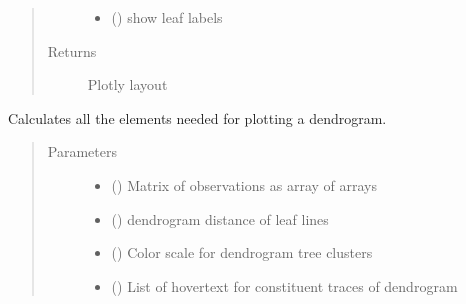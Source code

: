 \documentclass[letterpaper,10pt,english]{sphinxmanual}
\begin{document}
\begin{fulllineitems}
\begin{fulllineitems}
\begin{quote}
\begin{description}
\begin{itemize}
\item {} 
 () \textendash{} show leaf labels

\end{itemize}

\item[{Returns}] \leavevmode
Plotly layout

\end{description}\end{quote}

\end{fulllineitems}


\begin{fulllineitems}
\label{\detokenize{_autosummary/analytics_core.viz:analytics_core.viz.Dendrogram.Dendrogram.get_dendrogram_traces}}
Calculates all the elements needed for plotting a dendrogram.
\begin{quote}\begin{description}
\item[{Parameters}] \leavevmode\begin{itemize}
\item {} 
 () \textendash{} Matrix of observations as array of arrays

\item {} 
 () \textendash{} dendrogram distance of leaf lines

\item {} 
 () \textendash{} Color scale for dendrogram tree clusters

\item {} 
 () \textendash{} List of hovertext for constituent traces of dendrogram


\end{itemize}
\end{description}
\end{quote}
\end{fulllineitems}
\end{fulllineitems}
\end{document}
